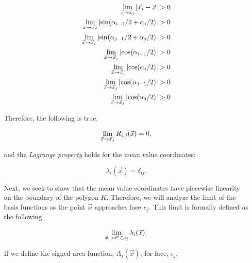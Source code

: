 \begin{equation}
\label{eq::App_BF_MV_R_terms}
\begin{aligned}
\lim\displaylimits_{\vec{x} \rightarrow \vec{x}_j}  | \vec{x}_i - \vec{x} |  > 0 \\
\lim\displaylimits_{\vec{x} \rightarrow \vec{x}_j} \left|  \sin (\alpha_{i-1}/2 + \alpha_{i}/2) \right| > 0 \\
\lim\displaylimits_{\vec{x} \rightarrow \vec{x}_j} \left|  \sin (\alpha_{j-1}/2 + \alpha_{j}/2) \right| > 0 \\
\lim\displaylimits_{\vec{x} \rightarrow \vec{x}_j} \left|  \cos (\alpha_{i-1}/2) \right| > 0 \\
\lim\displaylimits_{\vec{x} \rightarrow \vec{x}_j} \left|  \cos (\alpha_{i}/2) \right| > 0 \\
\lim\displaylimits_{\vec{x} \rightarrow \vec{x}_j} \left|  \cos (\alpha_{j-1}/2) \right| > 0 \\
\lim\displaylimits_{\vec{x} \rightarrow \vec{x}_j} \left|  \cos (\alpha_{j}/2) \right| > 0
\end{aligned}
\end{equation}

\noindent Therefore, the following is true,

\begin{equation}
\label{eq::App_BF_MV_Rlim}
\lim\displaylimits_{\vec{x} \rightarrow \vec{x}_j} R_{i,j}(\vec{x}) = 0 ,
\end{equation} 

\noindent and the {\em Lagrange property} holds for the mean value coordinates:

\begin{equation}
\label{eq::App_BF_MV_vertFINAL}
\lambda_i (\vec{x}) = \delta_{ij}.
\end{equation} 

Next, we seek to show that the mean value coordinates have piecewise linearity on the boundary of the polygon $K$. Therefore, we will analyze the limit of the basis functions as the point $\vec{x}$ approaches face $e_j$. This limit is formally defined as the following

\begin{equation}
\label{eq::App_BF_MV_edge_lim_init}
\lim\displaylimits_{\vec{x} \rightarrow \vec{x}^* \in e_j}  \lambda_i (\vec{x}) .
\end{equation} 

\noindent If we define the signed area function, $A_j (\vec{x})$, for face, $e_j$,


